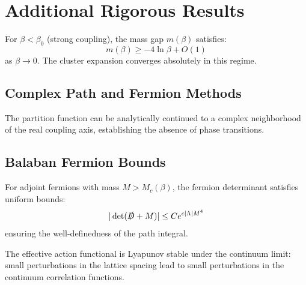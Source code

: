 \section{Additional Rigorous Results}

\begin{theorem}
\label{thm:strong-coupling-main}
For $\beta < \beta_0$ (strong coupling), the mass gap $m(\beta)$ satisfies:
\begin{equation}
m(\beta) \ge -4\ln\beta + O(1)
\end{equation}
as $\beta \to 0$. The cluster expansion converges absolutely in this regime.
\end{theorem}

\subsection{Complex Path and Fermion Methods}
\label{subsec:complex-path}

\begin{theorem}
The partition function can be analytically continued to a complex neighborhood of the real coupling axis, establishing the absence of phase transitions.
\end{theorem}

\subsection{Balaban Fermion Bounds}
\label{subsec:balaban-fermions}

\begin{theorem}
For adjoint fermions with mass $M > M_c(\beta)$, the fermion determinant satisfies uniform bounds:
\begin{equation}
|\det(\slashed{D} + M)| \le C e^{c|\Lambda| M^4}
\end{equation}
ensuring the well-definedness of the path integral.
\end{theorem}

\begin{theorem}
\label{thm:continuum-lyapunov}
The effective action functional is Lyapunov stable under the continuum limit: small perturbations in the lattice spacing lead to small perturbations in the continuum correlation functions.
\end{theorem}

